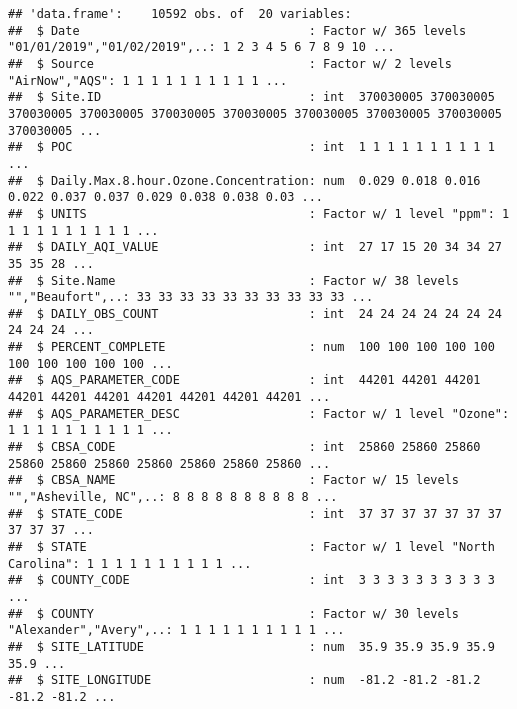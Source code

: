 \documentclass[]{article}
\newenvironment{Shaded}{\begin{snugshade}}{\end{snugshade}}
\newcommand{\KeywordTok}[1]{\textcolor[rgb]{0.13,0.29,0.53}{\textbf{#1}}}
\newcommand{\CommentTok}[1]{\textcolor[rgb]{0.56,0.35,0.01}{\textit{#1}}}
\newcommand{\NormalTok}[1]{#1}
\begin{document}
\begin{verbatim}
## 'data.frame':    10592 obs. of  20 variables:
##  $ Date                                : Factor w/ 365 levels "01/01/2019","01/02/2019",..: 1 2 3 4 5 6 7 8 9 10 ...
##  $ Source                              : Factor w/ 2 levels "AirNow","AQS": 1 1 1 1 1 1 1 1 1 1 ...
##  $ Site.ID                             : int  370030005 370030005 370030005 370030005 370030005 370030005 370030005 370030005 370030005 370030005 ...
##  $ POC                                 : int  1 1 1 1 1 1 1 1 1 1 ...
##  $ Daily.Max.8.hour.Ozone.Concentration: num  0.029 0.018 0.016 0.022 0.037 0.037 0.029 0.038 0.038 0.03 ...
##  $ UNITS                               : Factor w/ 1 level "ppm": 1 1 1 1 1 1 1 1 1 1 ...
##  $ DAILY_AQI_VALUE                     : int  27 17 15 20 34 34 27 35 35 28 ...
##  $ Site.Name                           : Factor w/ 38 levels "","Beaufort",..: 33 33 33 33 33 33 33 33 33 33 ...
##  $ DAILY_OBS_COUNT                     : int  24 24 24 24 24 24 24 24 24 24 ...
##  $ PERCENT_COMPLETE                    : num  100 100 100 100 100 100 100 100 100 100 ...
##  $ AQS_PARAMETER_CODE                  : int  44201 44201 44201 44201 44201 44201 44201 44201 44201 44201 ...
##  $ AQS_PARAMETER_DESC                  : Factor w/ 1 level "Ozone": 1 1 1 1 1 1 1 1 1 1 ...
##  $ CBSA_CODE                           : int  25860 25860 25860 25860 25860 25860 25860 25860 25860 25860 ...
##  $ CBSA_NAME                           : Factor w/ 15 levels "","Asheville, NC",..: 8 8 8 8 8 8 8 8 8 8 ...
##  $ STATE_CODE                          : int  37 37 37 37 37 37 37 37 37 37 ...
##  $ STATE                               : Factor w/ 1 level "North Carolina": 1 1 1 1 1 1 1 1 1 1 ...
##  $ COUNTY_CODE                         : int  3 3 3 3 3 3 3 3 3 3 ...
##  $ COUNTY                              : Factor w/ 30 levels "Alexander","Avery",..: 1 1 1 1 1 1 1 1 1 1 ...
##  $ SITE_LATITUDE                       : num  35.9 35.9 35.9 35.9 35.9 ...
##  $ SITE_LONGITUDE                      : num  -81.2 -81.2 -81.2 -81.2 -81.2 ...
\end{verbatim}

\begin{Shaded}
\end{Shaded}
\end{document}

